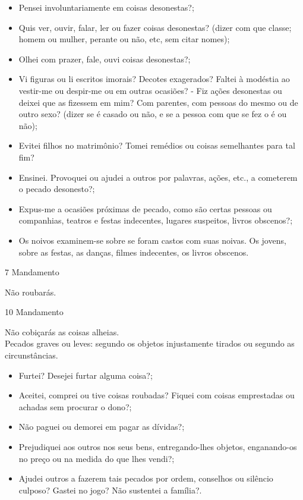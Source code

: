 \begin{itemize}
    \item Pensei involuntariamente em coisas desonestas?;
    \item Quis ver, ouvir, falar, ler ou fazer coisas desonestas? (dizer com que classe; homem ou mulher, perante ou não, etc, sem citar nomes);
    \item Olhei com prazer, fale, ouvi coisas desonestas?;
    \item Vi figuras ou li escritos imorais? Decotes exagerados? Faltei à modéstia ao vestir-me ou despir-me ou em outras ocasiões? - Fiz ações desonestas ou deixei que as fizessem em mim? Com parentes, com pessoas do mesmo ou de outro sexo? (dizer se é casado ou não, e se a pessoa com que se fez o é ou não);
    \item Evitei filhos no matrimônio? Tomei remédios ou coisas semelhantes para tal fim?
    \item Ensinei. Provoquei ou ajudei a outros por palavras, ações, etc., a cometerem o pecado desonesto?;
    \item Expus-me a ocasiões próximas de pecado, como são certas pessoas ou companhias, teatros e festas indecentes, lugares suspeitos, livros obscenos?;
    \item Os noivos examinem-se sobre se foram castos com suas noivas. Os jovens, sobre as festas, as danças, filmes indecentes, os livros obscenos.
\end{itemize}
\newpage
\begin{center}
    7\textordmasculine{} Mandamento
\end{center}
\begin{flushleft}
    Não roubarás.
\end{flushleft}
\begin{center}
    10\textordmasculine{} Mandamento
\end{center}
\begin{flushleft}
    Não cobiçarás as coisas alheias. \\
    \hfill{} \break{}
    Pecados graves ou leves: segundo os objetos injustamente tirados ou segundo as circunstâncias.
\end{flushleft}
\begin{itemize}
    \item Furtei? Desejei furtar alguma coisa?;
    \item Aceitei, comprei ou tive coisas roubadas? Fiquei com coisas emprestadas ou achadas sem procurar o dono?;
    \item Não paguei ou demorei em pagar as dívidas?;
    \item Prejudiquei aos outros nos seus bens, entregando-lhes objetos, enganando-os no preço ou na medida do que lhes vendi?;
    \item Ajudei outros a fazerem tais pecados por ordem, conselhos ou silêncio culposo? Gastei no jogo? Não sustentei a família?.
\end{itemize}
